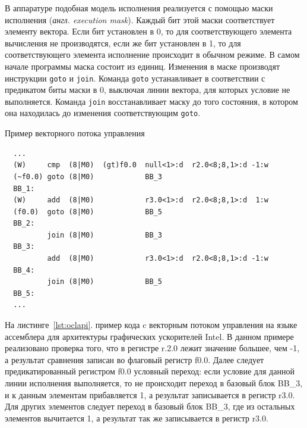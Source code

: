 В аппаратуре подобная модель исполнения реализуется с помощью маски исполнения (\textit{англ. execution mask}). Каждый бит этой маски соответствует элементу вектора. Если бит установлен в 0, то для соответствующего элемента вычисления не производятся, если же бит установлен в 1, то для соответствующего элемента исполнение происходит в обычном режиме. В самом начале программы маска состоит из единиц. Изменения в маске производят инструкции \texttt{goto} и \texttt{join}. Команда \texttt{goto} устанавливает в соответствии с предикатом биты маски в 0, выключая линии вектора, для которых условие не выполняется. Команда \texttt{join} восстанавливает маску до того состояния, в котором она находилась до изменения соответствующим \texttt{goto}.

\begin{ListingEnv}[!h]
    \captiondelim{ } 
    \caption{Пример векторного потока управления}\label{lst:simdcf}
    \begin{verbatim}
  ...
  (W)     cmp  (8|M0)  (gt)f0.0  null<1>:d  r2.0<8;8,1>:d -1:w
  (~f0.0) goto (8|M0)            BB_3
  BB_1:
  (W)     add  (8|M0)            r3.0<1>:d  r2.0<8;8,1>:d  1:w
  (f0.0)  goto (8|M0)            BB_5
  BB_2:
          join (8|M0)            BB_3
  BB_3:
          add  (8|M0)            r3.0<1>:d  r2.0<8;8,1>:d -1:w
  BB_4:
          join (8|M0)            BB_5
  BB_5:
  ...
    \end{verbatim}
\end{ListingEnv}

На листинге~\cref{lst:oclapi}. пример кода c векторным потоком управления на языке ассемблера для архитектуры графических ускорителей Intel. В данном примере реализовано проверка того, что в регистре r.2.0 лежит значение большее, чем -1, а результат сравнения записан во флаговый регистр f0.0. Далее следует предикатированный регистром f0.0 условный переход: если условие для данной линии исполнения выполняется, то не происходит переход в базовый блок BB\_3, и к данным элементам прибавляется 1, а результат записывается в регистр r3.0. Для других элементов следует переход в базовый блок BB\_3, где из остальных элементов вычитается 1, а результат так же записывается в регистр r3.0.

